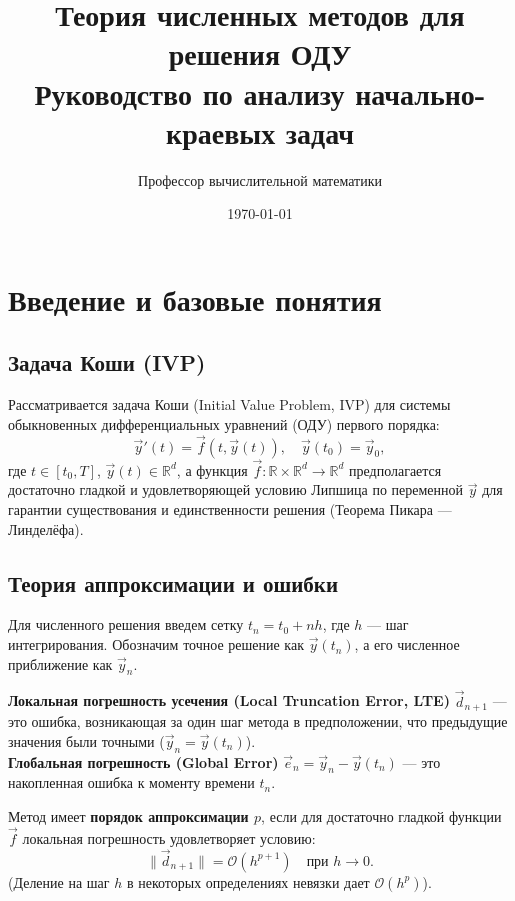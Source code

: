 \documentclass[12pt,a4paper]{article}
\title{\textbf{Теория численных методов для решения ОДУ}\\ \Large Руководство по анализу начально-краевых задач}
\author{Профессор вычислительной математики}
\date{\today}
\begin{document}
\maketitle
\tableofcontents
\newpage

\section{Введение и базовые понятия}

\subsection{Задача Коши (IVP)}
Рассматривается задача Коши (Initial Value Problem, IVP) для системы обыкновенных дифференциальных уравнений (ОДУ) первого порядка:
\begin{equation}
    \label{eq:ivp}
    \vec{y}'(t) = \vec{f}(t, \vec{y}(t)), \quad \vec{y}(t_0) = \vec{y}_0,
\end{equation}
где $t \in [t_0, T]$, $\vec{y}(t) \in \mathbb{R}^d$, а функция $\vec{f}: \mathbb{R} \times \mathbb{R}^d \to \mathbb{R}^d$ предполагается достаточно гладкой и удовлетворяющей условию Липшица по переменной $\vec{y}$ для гарантии существования и единственности решения (Теорема Пикара — Линделёфа).

\subsection{Теория аппроксимации и ошибки}
Для численного решения введем сетку $t_n = t_0 + n h$, где $h$ --- шаг интегрирования. Обозначим точное решение как $\vec{y}(t_n)$, а его численное приближение как $\vec{y}_n$.

\begin{definition}
\textbf{Локальная погрешность усечения (Local Truncation Error, LTE)} $\vec{d}_{n+1}$ — это ошибка, возникающая за один шаг метода в предположении, что предыдущие значения были точными ($\vec{y}_n = \vec{y}(t_n)$).
\\
\textbf{Глобальная погрешность (Global Error)} $\vec{e}_n = \vec{y}_n - \vec{y}(t_n)$ — это накопленная ошибка к моменту времени $t_n$.
\end{definition}

Метод имеет \textbf{порядок аппроксимации $p$}, если для достаточно гладкой функции $\vec{f}$ локальная погрешность удовлетворяет условию:
\[
    \|\vec{d}_{n+1}\| = \mathcal{O}(h^{p+1}) \quad \text{при } h \to 0.
\]
(Деление на шаг $h$ в некоторых определениях невязки дает $\mathcal{O}(h^p)$).
\end{document}
